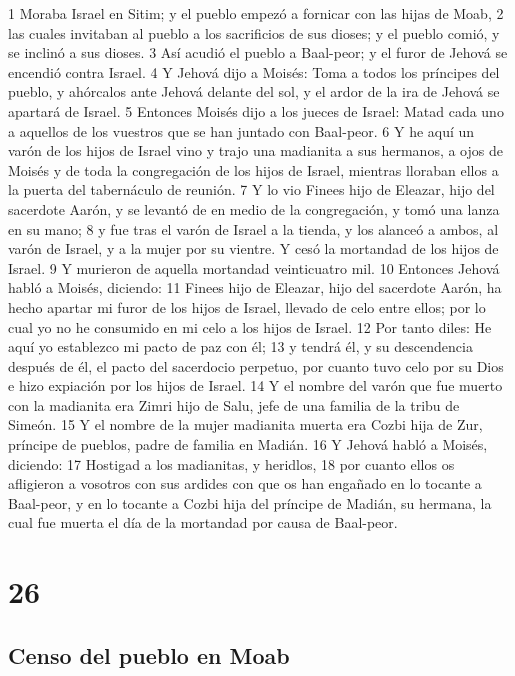1 Moraba Israel en Sitim; y el pueblo empezó a fornicar con las hijas de Moab,
2 las cuales invitaban al pueblo a los sacrificios de sus dioses; y el pueblo comió, y se inclinó a sus dioses.
3 Así acudió el pueblo a Baal-peor; y el furor de Jehová se encendió contra Israel.
4 Y Jehová dijo a Moisés: Toma a todos los príncipes del pueblo, y ahórcalos ante Jehová delante del sol, y el ardor de la ira de Jehová se apartará de Israel.
5 Entonces Moisés dijo a los jueces de Israel: Matad cada uno a aquellos de los vuestros que se han juntado con Baal-peor.
6 Y he aquí un varón de los hijos de Israel vino y trajo una madianita a sus hermanos, a ojos de Moisés y de toda la congregación de los hijos de Israel, mientras lloraban ellos a la puerta del tabernáculo de reunión.
7 Y lo vio Finees hijo de Eleazar, hijo del sacerdote Aarón, y se levantó de en medio de la congregación, y tomó una lanza en su mano;
8 y fue tras el varón de Israel a la tienda, y los alanceó a ambos, al varón de Israel, y a la mujer por su vientre. Y cesó la mortandad de los hijos de Israel.
9 Y murieron de aquella mortandad veinticuatro mil.
10 Entonces Jehová habló a Moisés, diciendo:
11 Finees hijo de Eleazar, hijo del sacerdote Aarón, ha hecho apartar mi furor de los hijos de Israel, llevado de celo entre ellos; por lo cual yo no he consumido en mi celo a los hijos de Israel.
12 Por tanto diles: He aquí yo establezco mi pacto de paz con él;
13 y tendrá él, y su descendencia después de él, el pacto del sacerdocio perpetuo, por cuanto tuvo celo por su Dios e hizo expiación por los hijos de Israel.
14 Y el nombre del varón que fue muerto con la madianita era Zimri hijo de Salu, jefe de una familia de la tribu de Simeón.
15 Y el nombre de la mujer madianita muerta era Cozbi hija de Zur, príncipe de pueblos, padre de familia en Madián.
16 Y Jehová habló a Moisés, diciendo:
17 Hostigad a los madianitas, y heridlos,
18 por cuanto ellos os afligieron a vosotros con sus ardides con que os han engañado en lo tocante a Baal-peor, y en lo tocante a Cozbi hija del príncipe de Madián, su hermana, la cual fue muerta el día de la mortandad por causa de Baal-peor.

\chapter{26}

\section*{Censo del pueblo en Moab}

